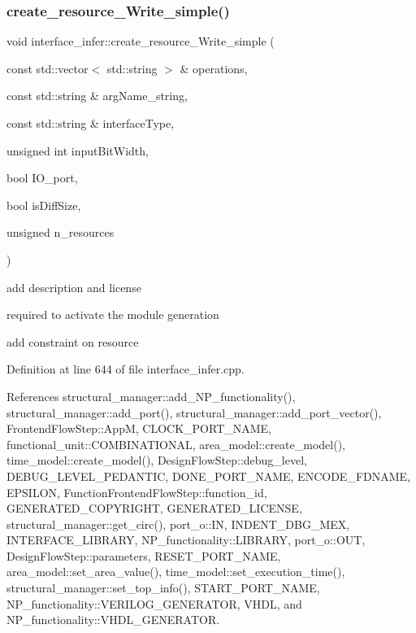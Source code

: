 \subsubsection{\texorpdfstring{create\+\_\+resource\+\_\+\+Write\+\_\+simple()}{create\_resource\_Write\_simple()}}
{\footnotesize\ttfamily void interface\+\_\+infer\+::create\+\_\+resource\+\_\+\+Write\+\_\+simple (\begin{DoxyParamCaption}\item[{const std\+::vector$<$ std\+::string $>$ \&}]{operations,  }\item[{const std\+::string \&}]{arg\+Name\+\_\+string,  }\item[{const std\+::string \&}]{interface\+Type,  }\item[{unsigned int}]{input\+Bit\+Width,  }\item[{bool}]{I\+O\+\_\+port,  }\item[{bool}]{is\+Diff\+Size,  }\item[{unsigned}]{n\+\_\+resources }\end{DoxyParamCaption})\hspace{0.3cm}{\ttfamily [private]}}

add description and license

required to activate the module generation

add constraint on resource 

Definition at line 644 of file interface\+\_\+infer.\+cpp.



References structural\+\_\+manager\+::add\+\_\+\+N\+P\+\_\+functionality(), structural\+\_\+manager\+::add\+\_\+port(), structural\+\_\+manager\+::add\+\_\+port\+\_\+vector(), Frontend\+Flow\+Step\+::\+AppM, C\+L\+O\+C\+K\+\_\+\+P\+O\+R\+T\+\_\+\+N\+A\+ME, functional\+\_\+unit\+::\+C\+O\+M\+B\+I\+N\+A\+T\+I\+O\+N\+AL, area\+\_\+model\+::create\+\_\+model(), time\+\_\+model\+::create\+\_\+model(), Design\+Flow\+Step\+::debug\+\_\+level, D\+E\+B\+U\+G\+\_\+\+L\+E\+V\+E\+L\+\_\+\+P\+E\+D\+A\+N\+T\+IC, D\+O\+N\+E\+\_\+\+P\+O\+R\+T\+\_\+\+N\+A\+ME, E\+N\+C\+O\+D\+E\+\_\+\+F\+D\+N\+A\+ME, E\+P\+S\+I\+L\+ON, Function\+Frontend\+Flow\+Step\+::function\+\_\+id, G\+E\+N\+E\+R\+A\+T\+E\+D\+\_\+\+C\+O\+P\+Y\+R\+I\+G\+HT, G\+E\+N\+E\+R\+A\+T\+E\+D\+\_\+\+L\+I\+C\+E\+N\+SE, structural\+\_\+manager\+::get\+\_\+circ(), port\+\_\+o\+::\+IN, I\+N\+D\+E\+N\+T\+\_\+\+D\+B\+G\+\_\+\+M\+EX, I\+N\+T\+E\+R\+F\+A\+C\+E\+\_\+\+L\+I\+B\+R\+A\+RY, N\+P\+\_\+functionality\+::\+L\+I\+B\+R\+A\+RY, port\+\_\+o\+::\+O\+UT, Design\+Flow\+Step\+::parameters, R\+E\+S\+E\+T\+\_\+\+P\+O\+R\+T\+\_\+\+N\+A\+ME, area\+\_\+model\+::set\+\_\+area\+\_\+value(), time\+\_\+model\+::set\+\_\+execution\+\_\+time(), structural\+\_\+manager\+::set\+\_\+top\+\_\+info(), S\+T\+A\+R\+T\+\_\+\+P\+O\+R\+T\+\_\+\+N\+A\+ME, N\+P\+\_\+functionality\+::\+V\+E\+R\+I\+L\+O\+G\+\_\+\+G\+E\+N\+E\+R\+A\+T\+OR, V\+H\+DL, and N\+P\+\_\+functionality\+::\+V\+H\+D\+L\+\_\+\+G\+E\+N\+E\+R\+A\+T\+OR.



